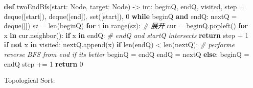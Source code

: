 \documentclass[
]{article}
\newenvironment{Shaded}{}{}
\newcommand{\BuiltInTok}[1]{#1}
\newcommand{\CommentTok}[1]{\textcolor[rgb]{0.38,0.63,0.69}{\textit{#1}}}
\newcommand{\ControlFlowTok}[1]{\textcolor[rgb]{0.00,0.44,0.13}{\textbf{#1}}}
\newcommand{\DecValTok}[1]{\textcolor[rgb]{0.25,0.63,0.44}{#1}}
\newcommand{\KeywordTok}[1]{\textcolor[rgb]{0.00,0.44,0.13}{\textbf{#1}}}
\newcommand{\NormalTok}[1]{#1}
\newcommand{\OperatorTok}[1]{\textcolor[rgb]{0.40,0.40,0.40}{#1}}
\begin{document}
\begin{Shaded}
\begin{Highlighting}[]
\KeywordTok{def}\NormalTok{ twoEndBfs(start: Node, target: Node) }\OperatorTok{{-}\textgreater{}} \BuiltInTok{int}\NormalTok{:}
\NormalTok{    beginQ, endQ, visited, step }\OperatorTok{=}\NormalTok{ deque([start]), deque([end]), }\BuiltInTok{set}\NormalTok{([start]), }\DecValTok{0}
    \ControlFlowTok{while}\NormalTok{ beginQ }\KeywordTok{and}\NormalTok{ endQ:}
\NormalTok{        nextQ }\OperatorTok{=}\NormalTok{ deque([])}
\NormalTok{        sz }\OperatorTok{=} \BuiltInTok{len}\NormalTok{(beginQ)}
        \ControlFlowTok{for}\NormalTok{ i }\KeywordTok{in} \BuiltInTok{range}\NormalTok{(sz):  }\CommentTok{\# 展开}
\NormalTok{            cur }\OperatorTok{=}\NormalTok{ beginQ.popleft()}
            \ControlFlowTok{for}\NormalTok{ x }\KeywordTok{in}\NormalTok{ cur.neighbor():}
                \ControlFlowTok{if}\NormalTok{ x }\KeywordTok{in}\NormalTok{ endQ:  }\CommentTok{\# endQ and startQ intersects}
                    \ControlFlowTok{return}\NormalTok{ step }\OperatorTok{+} \DecValTok{1}
                \ControlFlowTok{if} \KeywordTok{not}\NormalTok{ x }\KeywordTok{in}\NormalTok{ visited:}
\NormalTok{                    nextQ.append(x)}
        \ControlFlowTok{if} \BuiltInTok{len}\NormalTok{(endQ) }\OperatorTok{\textless{}} \BuiltInTok{len}\NormalTok{(nextQ):  }\CommentTok{\# performe reverse BFS from end if it\textquotesingle{}s better}
\NormalTok{        	beginQ }\OperatorTok{=}\NormalTok{ endQ}
\NormalTok{            endQ }\OperatorTok{=}\NormalTok{ nextQ}
        \ControlFlowTok{else}\NormalTok{:}
\NormalTok{            beginQ }\OperatorTok{=}\NormalTok{ endQ}
\NormalTok{        step }\OperatorTok{+=} \DecValTok{1}
    \ControlFlowTok{return} \DecValTok{0}
\end{Highlighting}
\end{Shaded}

Topological Sort:
\end{document}
